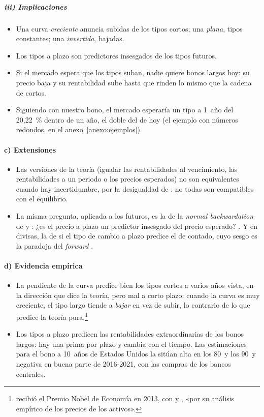 \documentclass[11pt]{article}
\begin{document}
\subparagraph{iii) Implicaciones}
\begin{itemize}
\item Una curva \emph{creciente} anuncia subidas de los tipos cortos; una \emph{plana}, tipos constantes; una \emph{invertida}, bajadas.
\item Los tipos a plazo son predictores insesgados de los tipos futuros.
\item Si el mercado espera que los tipos suban, nadie quiere bonos largos hoy: su precio baja y su rentabilidad sube hasta que rinden lo mismo que la cadena de cortos.
\item Siguiendo con nuestro bono, el mercado esperaría un tipo a 1~año del 20,22~\% dentro de un año, el doble del de hoy (el ejemplo con números redondos, en el anexo~\ref{anexo:ejemplos}).
\end{itemize}

\paragraph{c) Extensiones}
\begin{itemize}
\item Las versiones de la teoría (igualar las rentabilidades al vencimiento, las rentabilidades a un periodo o los precios esperados) no son equivalentes cuando hay incertidumbre, por la desigualdad de : no todas son compatibles con el equilibrio\nocite{CoxIngersollRoss1981Reexamination}.
\item La misma pregunta, aplicada a los futuros, es la de la \emph{normal backwardation} de  y : ¿es el precio a plazo un predictor insesgado del precio esperado? . Y en divisas, la de si el tipo de cambio a plazo predice el de contado, cuyo sesgo es la paradoja del \emph{forward} .
\end{itemize}

\paragraph{d) Evidencia empírica}
\begin{itemize}
\item La pendiente de la curva predice bien los tipos cortos a varios años vista, en la dirección que dice la teoría, pero mal a corto plazo: cuando la curva es muy creciente, el tipo largo tiende a \emph{bajar} en vez de subir, lo contrario de lo que predice la teoría pura\nocite{CampbellShiller1991Yield}.\footnote{ recibió el Premio Nobel de Economía en 2013, con  y , «por su análisis empírico de los precios de los activos»\nocite{Nobel2013FamaHansenShiller}.}
\item Los tipos a plazo predicen las rentabilidades extraordinarias de los bonos largos\nocite{FamaBliss1987Information,CochranePiazzesi2005Bond}: hay una prima por plazo y cambia con el tiempo. Las estimaciones para el bono a 10~años de Estados Unidos la sitúan alta en los 80~y los 90~y negativa en buena parte de 2016-2021, con las compras de los bancos centrales\nocite{AdrianCrumpMoench2013Pricing}.
\end{itemize}
\end{document}

